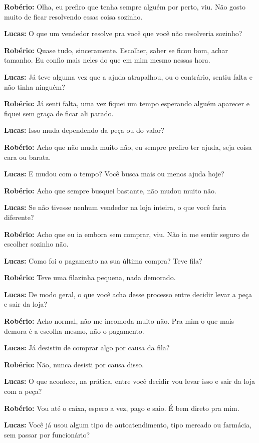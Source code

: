 \textbf{Robério:} Olha, eu prefiro que tenha sempre alguém por perto, viu. Não gosto muito de ficar resolvendo essas coisa sozinho.

\textbf{Lucas:} O que um vendedor resolve pra você que você não resolveria sozinho?

\textbf{Robério:} Quase tudo, sinceramente. Escolher, saber se ficou bom, achar tamanho. Eu confio mais neles do que em mim mesmo nessas hora.

\textbf{Lucas:} Já teve alguma vez que a ajuda atrapalhou, ou o contrário, sentiu falta e não tinha ninguém?

\textbf{Robério:} Já senti falta, uma vez fiquei um tempo esperando alguém aparecer e fiquei sem graça de ficar ali parado.

\textbf{Lucas:} Isso muda dependendo da peça ou do valor?

\textbf{Robério:} Acho que não muda muito não, eu sempre prefiro ter ajuda, seja coisa cara ou barata.

\textbf{Lucas:} E mudou com o tempo? Você busca mais ou menos ajuda hoje?

\textbf{Robério:} Acho que sempre busquei bastante, não mudou muito não.

\textbf{Lucas:} Se não tivesse nenhum vendedor na loja inteira, o que você faria diferente?

\textbf{Robério:} Acho que eu ia embora sem comprar, viu. Não ia me sentir seguro de escolher sozinho não.

\textbf{Lucas:} Como foi o pagamento na sua última compra? Teve fila?

\textbf{Robério:} Teve uma filazinha pequena, nada demorado.

\textbf{Lucas:} De modo geral, o que você acha desse processo entre decidir levar a peça e sair da loja?

\textbf{Robério:} Acho normal, não me incomoda muito não. Pra mim o que mais demora é a escolha mesmo, não o pagamento.

\textbf{Lucas:} Já desistiu de comprar algo por causa da fila?

\textbf{Robério:} Não, nunca desisti por causa disso.

\textbf{Lucas:} O que acontece, na prática, entre você decidir vou levar isso e sair da loja com a peça?

\textbf{Robério:} Vou até o caixa, espero a vez, pago e saio. É bem direto pra mim.

\textbf{Lucas:} Você já usou algum tipo de autoatendimento, tipo mercado ou farmácia, sem passar por funcionário?

